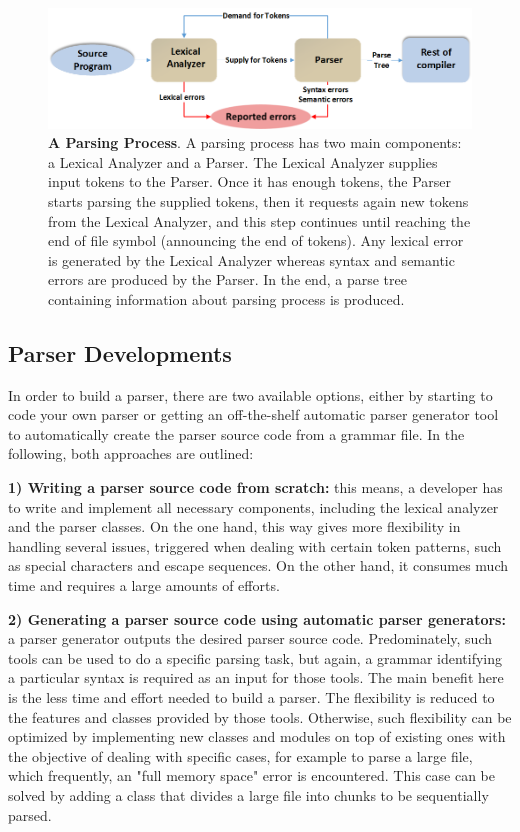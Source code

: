 \begin{figure}[ht]
	\begin{center}	\setlength\belowcaptionskip{-5mm}
	\includegraphics[scale=0.55,angle=0]{images/ParserRole}
	\caption{\textbf{A Parsing Process}. 
	A parsing process has two main components: a Lexical Analyzer and a Parser. 
	The Lexical Analyzer supplies input tokens to the Parser.
	Once it has enough tokens, the Parser starts parsing the supplied tokens, then it requests again new tokens from the Lexical Analyzer, and this step continues until reaching the end of file symbol (announcing the end of tokens).	Any lexical error is generated by the Lexical Analyzer whereas syntax and semantic errors are produced by the Parser.
	In the end, a parse tree containing information about parsing process is produced.}
		\label{Fig:parserPosition}
	\end{center}
\end{figure}

\subsection{Parser Developments}
In order to build a parser, there are two available options, either by starting to code your own parser or getting an off-the-shelf automatic parser generator tool to automatically create the parser source code from a grammar file. 
In the following, both approaches are outlined:

\textbf{1) Writing a parser source code from scratch:} this means, a developer has to write and implement all necessary components, including the lexical analyzer and the parser classes. 
On the one hand, this way gives more flexibility in handling several issues, triggered when dealing with certain token patterns, such as special characters and escape sequences. 
On the other hand, it consumes much time and requires a large amounts of efforts.

\textbf{2) Generating a parser source code using automatic parser generators:} a parser generator outputs the desired parser source code. 
Predominately, such tools can be used to do a specific parsing task, but again, a grammar identifying a particular syntax is required as an input for those tools. 
The main benefit here is the less time and effort needed to build a parser.
The flexibility is reduced to the features and classes provided by those tools.
Otherwise, such flexibility can be optimized by implementing new classes and modules on top of existing ones with the objective of dealing with specific cases, for example to parse a large file, which frequently, an "full memory space" error is encountered.
This case can be solved by adding a class that divides a large file into chunks to be sequentially parsed.  


